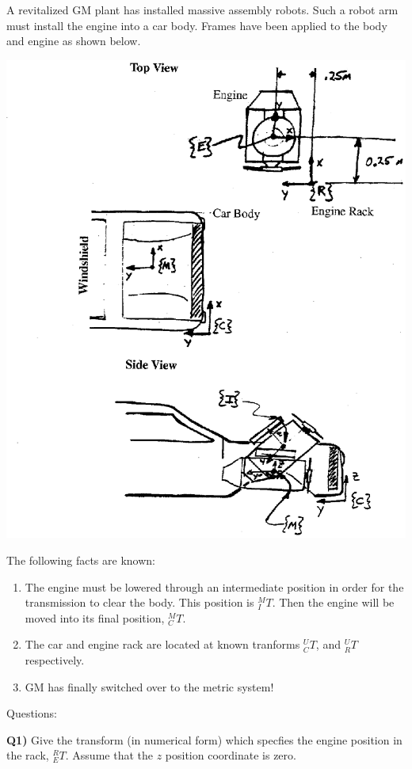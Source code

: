 \begin{Example}
A revitalized GM plant has installed massive assembly robots.  Such a robot arm must install the engine into a car body.   Frames have been applied to the body and engine as shown below.

\includegraphics[width=5.5in]{figs02/00439.eps}

The following facts are known:

\begin{enumerate}
	\item The engine must be lowered through an intermediate position in order for the transmission to clear the body. This position is $^M_IT$.  Then the engine will be moved into its final position, $^M_CT$.

	\item The car and engine rack are located at known tranforms $^U_CT$, and $^U_RT$ respectively.

	\item GM has finally switched over to the metric system!
\end{enumerate}
Questions:

{\bf Q1)} Give the transform (in numerical form) which specfies the engine position in the rack, $^R_ET$.  Assume that the $z$ position coordinate is zero.

\end{Example}
